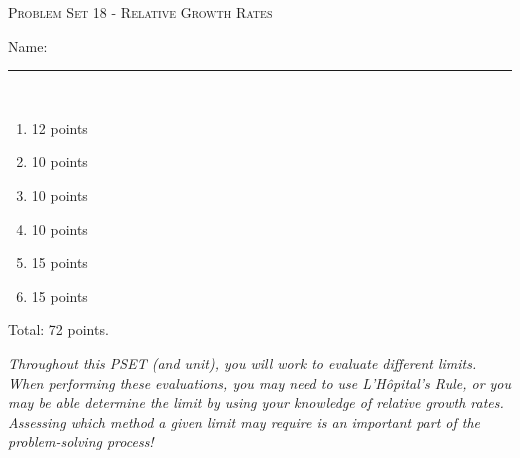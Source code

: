 \documentclass{article}
\begin{document}
\begin{center}
\large\textsc{Problem Set 18 - Relative Growth Rates}
  
      \pspace{12pt}
  \begin{problemonly}\large Name: \rule{5cm}{0.15mm}\\ \end{problemonly}
\end{center}


\begin{grading}
\begin{enumerate}
    \item 12 points
    \item 10 points
    \item 10 points
    \item 10 points
    \item 15 points
    \item 15 points
\end{enumerate}
Total: 72 points.
\end{grading}

\begin{framed}
   \textit{Throughout this PSET (and unit), you will work to evaluate different limits. When performing these evaluations, you may need to use L'H\^opital's Rule, or you may be able determine the limit by using your knowledge of relative growth rates. Assessing which method a given limit may require is an important part of the problem-solving process!} 
\end{framed}
\end{document}
